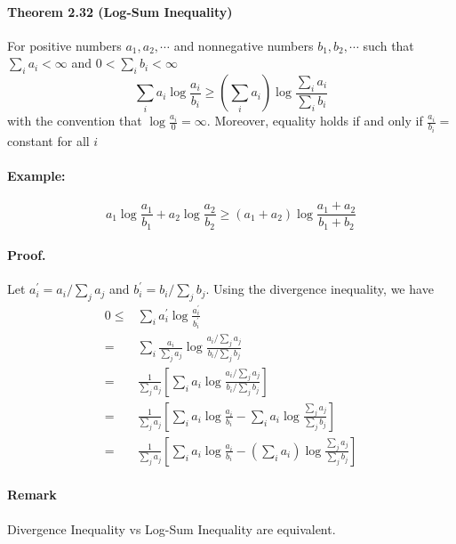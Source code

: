 \documentclass[8pt]{article}
\begin{document}
\begin{tcolorbox}
\paragraph{Theorem 2.32 (Log-Sum Inequality)} For positive numbers $a_{1}, a_{2}, \cdots$ and nonnegative numbers $b_{1}, b_{2}, \cdots$ such that $\sum_{i} a_{i}<\infty$ and $0<\sum_{i} b_{i}<\infty$
$$
\sum_{i} a_{i} \log \frac{a_{i}}{b_{i}} \geq\left(\sum_{i} a_{i}\right) \log \frac{\sum_{i} a_{i}}{\sum_{i} b_{i}}
$$
with the convention that $\log \frac{a_{i}}{0}=\infty .$ Moreover, equality holds if and only if $\frac{a_{i}}{b_{i}}=$constant for all $i$
\\
\paragraph{Example:}
$$
a_{1} \log \frac{a_{1}}{b_{1}}+a_{2} \log \frac{a_{2}}{b_{2}} \geq\left(a_{1}+a_{2}\right) \log \frac{a_{1}+a_{2}}{b_{1}+b_{2}}
$$
\end{tcolorbox}
\paragraph{Proof.}
Let $a_{i}^{\prime}=a_{i} / \sum_{j} a_{j}$ and $b_{i}^{\prime}=b_{i} / \sum_{j} b_{j}$. Using the divergence inequality, we have
$$
\begin{aligned}
0 \leq & \sum_{i} a_{i}^{\prime} \log \frac{a_{i}^{\prime}}{b_{i}^{\prime}} \\
=& \sum_{i} \frac{a_{i}}{\sum_{j} a_{j}} \log \frac{a_{i} / \sum_{j} a_{j}}{b_{i} / \sum_{j} b_{j}} \\
=& \frac{1}{\sum_{j} a_{j}}\left[\sum_{i} a_{i} \log \frac{a_{i} / \sum_{j} a_{j}}{b_{i} / \sum_{j} b_{j}}\right] \\
=& \frac{1}{\sum_{j} a_{j}}\left[\sum_{i} a_{i} \log \frac{a_{i}}{b_{i}}-\sum_{i} a_{i} \log \frac{\sum_{j} a_{j}}{\sum_{j} b_{j}}\right] \\
=& \frac{1}{\sum_{j} a_{j}}\left[\sum_{i} a_{i} \log \frac{a_{i}}{b_{i}}-\left(\sum_{i} a_{i}\right) \log \frac{\sum_{j} a_{j}}{\sum_{j} b_{j}}\right]
\end{aligned}
$$

\paragraph{Remark} Divergence Inequality vs Log-Sum Inequality are equivalent.
\end{document}
